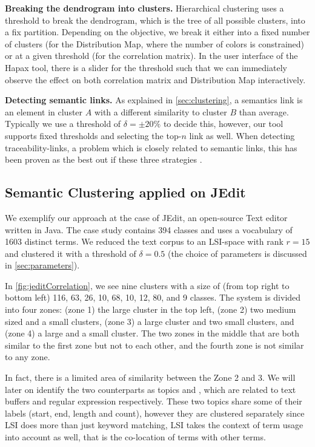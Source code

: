   \textbf{Breaking the dendrogram into clusters.} Hierarchical clustering uses a threshold to break the dendrogram, which is the tree of all possible clusters, into a fix partition. Depending on the objective, we break it either into a fixed number of clusters (\eg for the Distribution Map, where the number of colors is constrained) or at a given threshold (\eg for the correlation matrix). In the user interface of the Hapax tool, there is a slider for the threshold such that we can immediately observe the effect on both correlation matrix and Distribution Map interactively.

  \textbf{Detecting semantic links.} As explained in \autoref{sec:clustering}, a semantics link is an element in cluster $A$ with a different similarity to cluster $B$ than average. Typically we use a threshold of $\delta = \pm20\%$ to decide this, however, our tool supports fixed thresholds and selecting the top-$n$ link as well. When detecting traceability-links, a problem which is closely related to semantic links, this has been proven as the best out if these three strategies \cite{Luci04a}.

\subsection{Semantic Clustering applied on JEdit}

We exemplify our approach at the case of JEdit, an open-source Text editor written in Java. The case study contains 394 classes and uses a vocabulary of 1603 distinct terms. We reduced the text corpus to an LSI-space with rank $r = 15$ and clustered it with a threshold of $\delta = 0.5$ (the choice of parameters is discussed in \autoref{sec:parameters}).

In \autoref{fig:jeditCorrelation}, we see nine clusters with a size of (from top right to bottom left) 116, 63, 26, 10, 68, 10, 12, 80, and 9 classes. The system is divided into four zones: (zone 1) the large cluster in the top left, (zone 2) two medium sized and a small clusters, (zone 3) a large cluster and two small clusters, and (zone 4) a large and a small cluster. The two zones in the middle that are both similar to the first zone but not to each other, and the fourth zone is not similar to any zone.

In fact, there is a limited area of similarity between the Zone 2 and 3. We will later on identify the two counterparts as topics \pink and \cyan, which are related to text buffers and regular expression respectively. These two topics share some of their labels (\ie start, end, length and count), however they are clustered separately since LSI does more than just keyword matching, LSI takes the context of term usage into account as well, that is the co-location of terms with other terms.

